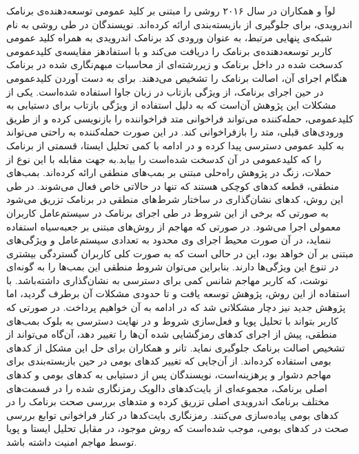لوآ و همکاران در سال ۲۰۱۶ روشی را مبتنی بر کلید عمومی توسعه‌دهنده‌ی برنامک اندرویدی، برای جلوگیری از بازبسته‌بندی ارائه کرده‌اند. نویسندگان در طی روشی به نام شبکه‌ی پنهایی مرتبط، به عنوان ورودی کد برنامک اندرویدی به همراه کلید عمومی کاربر توسعه‌دهنده‌ی برنامک را دریافت می‌کند و با استفادهز مقایسه‌ی کلید‌عمومی کد‌سخت شده در داخل برنامک و زیررشته‌ای از محاسبات مبهم‌نگاری شده در برنامک هنگام اجرای آن، اصالت برنامک را تشخیص می‌دهند. برای به ‌دست آوردن کلید‌عمومی در حین اجرای برنامک، از ویژگی بازتاب در زبان جاوا استفاده شده‌است. یکی از مشکلات این پژوهش آن‌است که به دلیل استفاده از ویژگی بازتاب برای دستیابی به کلید‌عمومی، حمله‌کننده می‌تواند فراخوانی متد فراخواننده را بازنویسی کرده و از طریق ورودی‌های قبلی، متد را بازفراخوانی کند. در این صورت حمله‌کننده به راحتی می‌تواند به کلید عمومی دسترسی پیدا کرده و در ادامه با کمی تحلیل ایستا، قسمتی از برنامک را که کلید‌عمومی در آن کد‌سخت شده‌است را بیابد.به جهت مقابله با این نوع از حملات، زنگ در پژوهش راه‌حلی مبتنی بر بمب‌های منطقی ارا‌ئه کرده‌اند. بمب‌های منطقی، قطعه‌ کد‌های کوچکی هستند که تنها در حالاتی خاص فعال می‌شوند. در طی این روش، کد‌های نشان‌گذاری در ساختار شرط‌های منطقی در برنامک تزریق می‌شود به صورتی که برخی از این شروط‌ در طی اجرای برنامک در سیستم‌عامل کاربران معمولی اجرا می‌شود. در صورتی که مهاجم از روش‌های مبتنی بر جعبه‌سیاه استفاده ننماید، در آن صورت محیط اجرای وی محدود به تعدادی سیستم‌عامل و ویژگی‌های مبتنی بر آن خواهد بود، این در حالی است که به صورت کلی کاربران گستردگی بیشتری در تنوع این ویژگی‌ها دارند. بنابراین می‌توان شروط منطقی این بمب‌ها را به گونه‌ای نوشت، که کاربر مهاجم شانس کمی برای دسترسی به نشان‌گذاری داشته‌باشد. با استفاده از این روش، پژوهش  توسعه یافت و تا حدودی مشکلات آن برطرف گردید، اما پژوهش جدید نیز دچار مشکلاتی شد که در ادامه به آن خواهیم پرداخت. در صورتی که کاربر بتواند با تحلیل پویا و فعل‌سازی شروط و در نهایت دسترسی به بلوک بمب‌های منطقی، پیش از اجرای کد‌های رمزگشایی شده آن‌ها را تغییر دهد، آن‌گاه می‌تواند از تشخیص اصالت برنامک جلوگیری نماید. تانر و همکاران برای حل این مشکل از کد‌های بومی استفاده کرده‌اند. از آن‌جایی که تغییر کد‌های بومی در حین بازبسته‌بندی برای مهاجم دشوار و پرهزینه‌است، نویسندگان پس از دستیابی به کد‌های بومی و کد‌های اصلی برنامک، مجموعه‌ای از بایت‌کد‌های دالویک رمز‌نگاری شده را در قسمت‌های مختلف برنامک اندرویدی اصلی تزریق کرده و متد‌های بررسی صحت برنامک را در کد‌های بومی پیاده‌سازی می‌کنند. رمز‌نگاری بایت‌کد‌ها در کنار فراخوانی توابع بررسی صحت در کدهای بومی، موجب شده‌است که روش موجود، در مقابل تحلیل ایستا و پویا توسط مهاجم امنیت داشته باشد.
